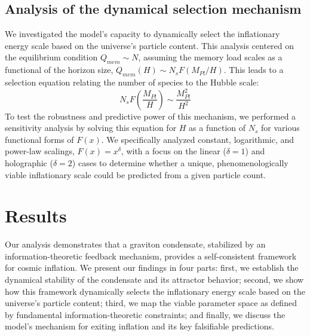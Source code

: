 \documentclass[]{article}
\begin{document}
\subsection{Analysis of the dynamical selection mechanism}
We investigated the model's capacity to dynamically select the inflationary energy scale based on the universe's particle content. This analysis centered on the equilibrium condition $Q_{mem} \sim N$, assuming the memory load scales as a functional of the horizon size, $Q_{mem}(H) \sim N_s F(M_{Pl}/H)$. This leads to a selection equation relating the number of species to the Hubble scale:
\begin{equation}
N_s F\left(\frac{M_{Pl}}{H}\right) \sim \frac{M_{Pl}^2}{H^2}
\label{eq:selection}
\end{equation}
To test the robustness and predictive power of this mechanism, we performed a sensitivity analysis by solving this equation for $H$ as a function of $N_s$ for various functional forms of $F(x)$. We specifically analyzed constant, logarithmic, and power-law scalings, $F(x) = x^\delta$, with a focus on the linear ($\delta=1$) and holographic ($\delta=2$) cases to determine whether a unique, phenomenologically viable inflationary scale could be predicted from a given particle count.

\section{Results}
\label{sec:results}
Our analysis demonstrates that a graviton condensate, stabilized by an information-theoretic feedback mechanism, provides a self-consistent framework for cosmic inflation. We present our findings in four parts: first, we establish the dynamical stability of the condensate and its attractor behavior; second, we show how this framework dynamically selects the inflationary energy scale based on the universe's particle content; third, we map the viable parameter space as defined by fundamental information-theoretic constraints; and finally, we discuss the model's mechanism for exiting inflation and its key falsifiable predictions.
\end{document}
